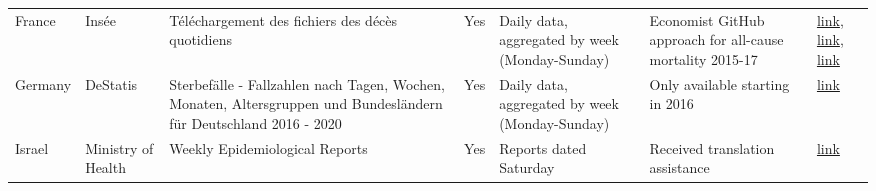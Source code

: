 \documentclass[
]{article}
\begin{document}
\begin{landscape}
\begin{table}[]
\begin{tabular}{p{.5in}p{1.5in}p{2in}p{1in}p{1.5in}p{1in}p{.5in}}
France           & Insée                                                                                                                                                                & Téléchargement des fichiers des décès quotidiens                                                                                                                           & Yes               & Daily data, aggregated by week (Monday-Sunday) & Economist GitHub approach for all-cause mortality 2015-17                    & \href{https://www.insee.fr/fr/statistiques/4487988?sommaire=4487854}{link},
\href{https://www.insee.fr/fr/information/4190491}{link}, \href{https://github.com/TheEconomist/covid-19-excess-deaths-tracker}{link}                                                                                                                                                               \\
Germany          & DeStatis                                                                                                                                                             & Sterbefälle - Fallzahlen nach Tagen, Wochen, Monaten,   Altersgruppen und Bundesländern für Deutschland 2016 - 2020                                                        & Yes               & Daily data, aggregated by week (Monday-Sunday) & Only available starting in 2016                                          & \href{https://www.destatis.de/DE/Themen/Gesellschaft-Umwelt/Bevoelkerung/Sterbefaelle-Lebenserwartung/Tabellen/sonderauswertung-sterbefaelle.html}{link}                                                                                                                                                                                   \\
Israel           & Ministry of Health                                                                                                                                                   & Weekly Epidemiological Reports                                                                                                                                      & Yes               & Reports dated Saturday                                          & Received translation assistance                                          & \href{https://www.health.gov.il/UnitsOffice/HD/PH/epidemiology/Pages/epidemiology\_report.aspx?WPID=WPQ7\&PN=7\&fbclid=IwAR2sz9mHp4lpB8rXm0gdvIoiftfnmmHqSwra8IWl7voMw1mmpffzWrRG774}{link}                                                                                                                                                \\

\end{tabular}
\end{table}
\end{landscape}
\end{document}
